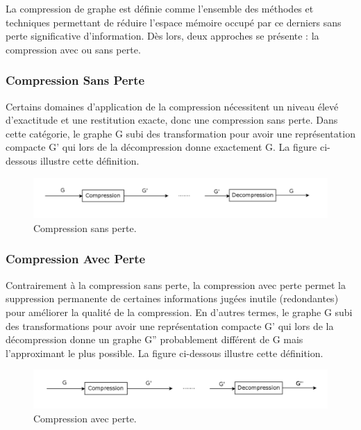 	
			La compression de graphe est définie comme l'ensemble des méthodes et techniques permettant de réduire l'espace mémoire occupé par ce derniers sans perte significative d'information. Dès lors, deux approches se présente : la compression avec ou sans perte.
			
			\subsubsection{Compression Sans Perte}
			Certains domaines d'application de la compression nécessitent un niveau élevé d'exactitude et une restitution exacte, donc une compression sans perte. Dans cette catégorie, le graphe G subi des transformation pour avoir une représentation compacte G' qui lors de la décompression donne exactement G. La figure ci-dessous illustre cette définition.
			\begin{figure}[h]
			\includegraphics[scale=0.3,center]{./ressources/image/SansPerte.png}
			\caption[Compression Sans Perte.]{Compression sans perte.}
			\end{figure}
			
			\subsubsection{Compression Avec Perte}
			
			Contrairement à la compression sans perte, la compression avec perte permet la suppression permanente de certaines informations jugées inutile (redondantes) pour améliorer la qualité de la compression. En d'autres termes, le graphe G subi des transformations pour avoir une représentation compacte G’ qui lors de la décompression donne un graphe G'' probablement différent de G mais l'approximant le plus possible. La figure ci-dessous illustre cette définition.
			\begin{figure}[h]
			\includegraphics[scale=0.3,center]{./ressources/image/AvecPerte.png}
			\caption[Compression avec perte.]{Compression avec perte.}
			\end{figure}